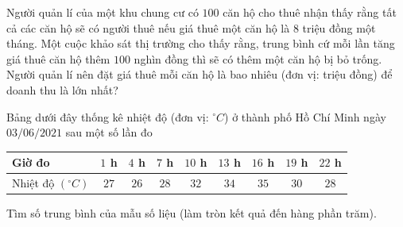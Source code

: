 \begin{ex}%
Người quản lí của một khu chung cư có $100$ căn hộ cho thuê nhận thấy rằng tất cả các căn hộ sẽ có người thuê nếu giá thuê một căn hộ là $8$ triệu đồng một tháng. Một cuộc khảo sát thị trường cho thấy rằng, trung bình cứ mỗi lần tăng giá thuê căn hộ thêm $100$ nghìn đồng thì sẽ có thêm một căn hộ bị bỏ trống. Người quản lí nên đặt giá thuê mỗi căn hộ là bao nhiêu (đơn vị: triệu đồng) để doanh thu là lớn nhất?
\par {}
\end{ex}

\begin{ex}%
Bảng dưới đây thống kê nhiệt độ (đơn vị: ${}^{\circ}{C}$) ở thành phố Hồ Chí Minh ngày $03 / 06 / 2021$ sau một số lần đo
\begin{center}
\begin{tabular}{|l|c|c|c|c|c|c|c|c|}
\hline Giờ đo & $1 $ h
& $4 $ h & $7 $ h & $10 $ h & $13 $ h & $16 $ h & $19 $ h & $22 $ h \\
\hline Nhiệt độ $\left({}^{\circ}{C}\right)$ & $27$ & $26$ & $28$ & $32$ & $34$ & $35$ & $30$ & $28$ \\
\hline
\end{tabular}
\end{center}
Tìm số trung bình của mẫu số liệu (làm tròn kết quả đến hàng phần trăm).
\end{ex}

